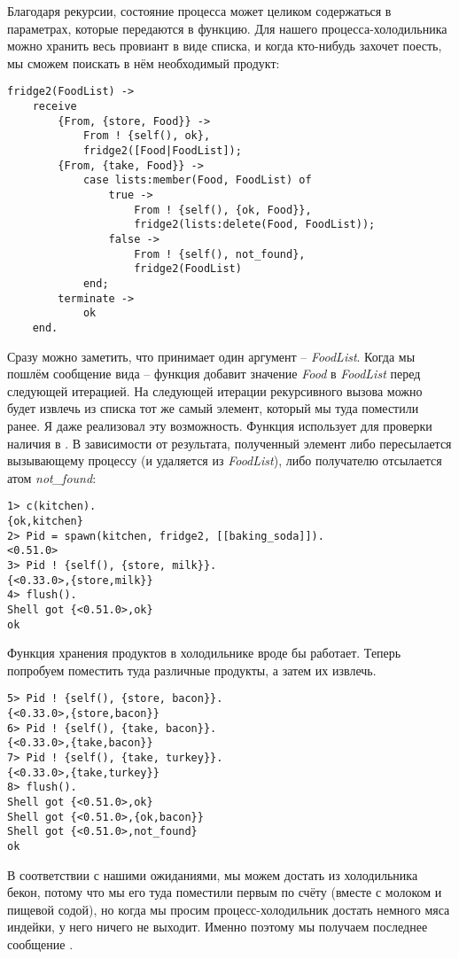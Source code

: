 Благодаря рекурсии, состояние процесса может целиком содержаться в параметрах, которые передаются в функцию.
Для нашего процесса\--холодильника можно хранить весь провиант в виде списка, и когда кто\--нибудь захочет поесть, мы сможем поискать в нём необходимый продукт:
\begin{lstlisting}[style=erlang]
fridge2(FoodList) ->
    receive
        {From, {store, Food}} ->
            From ! {self(), ok},
            fridge2([Food|FoodList]);
        {From, {take, Food}} ->
            case lists:member(Food, FoodList) of
                true ->
                    From ! {self(), {ok, Food}},
                    fridge2(lists:delete(Food, FoodList));
                false ->
                    From ! {self(), not_found},
                    fridge2(FoodList)
            end;
        terminate ->
            ok
    end.
\end{lstlisting}

Сразу можно заметить, что  принимает один аргумент \--- \emph{FoodList}.
Когда мы пошлём сообщение вида  \--- функция добавит значение \emph{Food} в \emph{FoodList} перед следующей итерацией.
На следующей итерации рекурсивного вызова можно будет извлечь из списка тот же самый элемент, который мы туда поместили ранее.
Я даже реализовал эту возможность.
Функция использует  для проверки наличия  в .
В зависимости от результата, полученный элемент либо пересылается вызывающему процессу (и удаляется из \emph{FoodList}), либо получателю отсылается атом \emph{not\_found}:
\begin{lstlisting}[style=erlang]
1> c(kitchen).
{ok,kitchen}
2> Pid = spawn(kitchen, fridge2, [[baking_soda]]).
<0.51.0>
3> Pid ! {self(), {store, milk}}.
{<0.33.0>,{store,milk}}
4> flush().
Shell got {<0.51.0>,ok}
ok
\end{lstlisting}

Функция хранения продуктов в холодильнике вроде бы работает.
Теперь попробуем поместить туда различные продукты, а затем их извлечь.
\begin{lstlisting}[style=erlang]
5> Pid ! {self(), {store, bacon}}.
{<0.33.0>,{store,bacon}}
6> Pid ! {self(), {take, bacon}}.
{<0.33.0>,{take,bacon}}
7> Pid ! {self(), {take, turkey}}.
{<0.33.0>,{take,turkey}}
8> flush().
Shell got {<0.51.0>,ok}
Shell got {<0.51.0>,{ok,bacon}}
Shell got {<0.51.0>,not_found}
ok
\end{lstlisting}

В соответствии с нашими ожиданиями, мы можем достать из холодильника бекон, потому что мы его туда поместили первым по счёту (вместе с молоком и пищевой содой), но когда мы просим процесс\--холодильник достать немного мяса индейки, у него ничего не выходит.
Именно поэтому мы получаем последнее сообщение .
